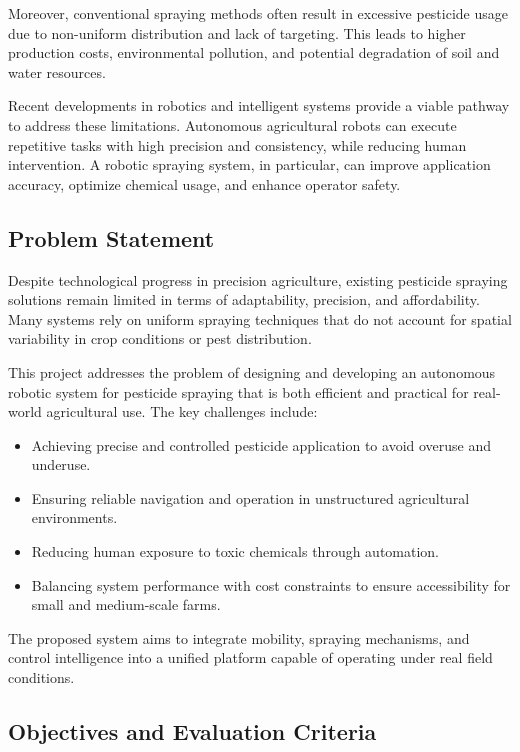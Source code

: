 Moreover, conventional spraying methods often result in excessive pesticide usage due to non-uniform distribution and lack of targeting. This leads to higher production costs, environmental pollution, and potential degradation of soil and water resources.

Recent developments in robotics and intelligent systems provide a viable pathway to address these limitations. Autonomous agricultural robots can execute repetitive tasks with high precision and consistency, while reducing human intervention. A robotic spraying system, in particular, can improve application accuracy, optimize chemical usage, and enhance operator safety.

\subsection{Problem Statement}

Despite technological progress in precision agriculture, existing pesticide spraying solutions remain limited in terms of adaptability, precision, and affordability. Many systems rely on uniform spraying techniques that do not account for spatial variability in crop conditions or pest distribution.

This project addresses the problem of designing and developing an autonomous robotic system for pesticide spraying that is both efficient and practical for real-world agricultural use. The key challenges include:

\begin{itemize}
    \item Achieving precise and controlled pesticide application to avoid overuse and underuse.
    \item Ensuring reliable navigation and operation in unstructured agricultural environments.
    \item Reducing human exposure to toxic chemicals through automation.
    \item Balancing system performance with cost constraints to ensure accessibility for small and medium-scale farms.
\end{itemize}

The proposed system aims to integrate mobility, spraying mechanisms, and control intelligence into a unified platform capable of operating under real field conditions.

\subsection{Objectives and Evaluation Criteria}

